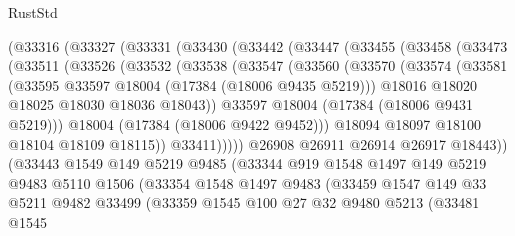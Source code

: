 \begin{lexlean}{RustStd}
\begin{coremodule}
      (@33316
        (@33327
          (@33331
            (@33430
              (@33442
                (@33447
                  (@33455
                    (@33458
                      (@33473
                        (@33511
                          (@33526
                            (@33532
                              (@33538
                                (@33547
                                  (@33560
                                    (@33570
                                      (@33574
                                        (@33581
                                          (@33595 @33597 @18004 (@17384 (@18006 @9435 @5219)))
                                          @18016
                                          @18020
                                          @18025
                                          @18030
                                          @18036
                                          @18043))
                                      @33597
                                      @18004
                                      (@17384 (@18006 @9431 @5219)))
                                    @18004
                                    (@17384 (@18006 @9422 @9452)))
                                  @18094
                                  @18097
                                  @18100
                                  @18104
                                  @18109
                                  @18115))
                              @33411)))))
                    @26908
                    @26911
                    @26914
                    @26917
                    @18443))
                (@33443
                  @1549
                  @149
                  @5219
                  @9485
                  (@33344
                    @919
                    @1548
                    @1497
                    @149
                    @5219
                    @9483
                    @5110
                    @1506
                    (@33354
                      @1548
                      @1497
                      @9483
                      (@33459
                        @1547
                        @149
                        @33
                        @5211
                        @9482
                        @33499
                        (@33359
                          @1545
                          @100
                          @27
                          @32
                          @9480
                          @5213
                          (@33481
                            @1545

\end{coremodule}
\end{lexlean}
